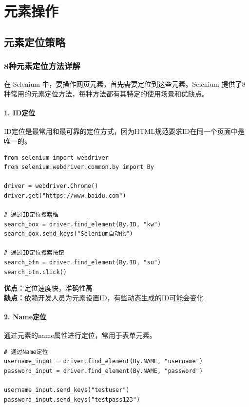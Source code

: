 \chapter{元素操作}

\section{元素定位策略}

\subsection{8种元素定位方法详解}

在 Selenium 中，要操作网页元素，首先需要定位到这些元素。Selenium 提供了8种常用的元素定位方法，每种方法都有其特定的使用场景和优缺点。

\subsubsection{1. ID定位}
ID定位是最常用和最可靠的定位方式，因为HTML规范要求ID在同一个页面中是唯一的。

\begin{lstlisting}[style=demostyle,numbers=none]
from selenium import webdriver
from selenium.webdriver.common.by import By

driver = webdriver.Chrome()
driver.get("https://www.baidu.com")

# 通过ID定位搜索框
search_box = driver.find_element(By.ID, "kw")
search_box.send_keys("Selenium自动化")

# 通过ID定位搜索按钮
search_btn = driver.find_element(By.ID, "su")
search_btn.click()
\end{lstlisting}

\textbf{优点：}定位速度快，准确性高\\
\textbf{缺点：}依赖开发人员为元素设置ID，有些动态生成的ID可能会变化

\subsubsection{2. Name定位}
通过元素的name属性进行定位，常用于表单元素。

\begin{lstlisting}[style=demostyle,numbers=none]
# 通过Name定位
username_input = driver.find_element(By.NAME, "username")
password_input = driver.find_element(By.NAME, "password")

username_input.send_keys("testuser")
password_input.send_keys("testpass123")
\end{lstlisting}

